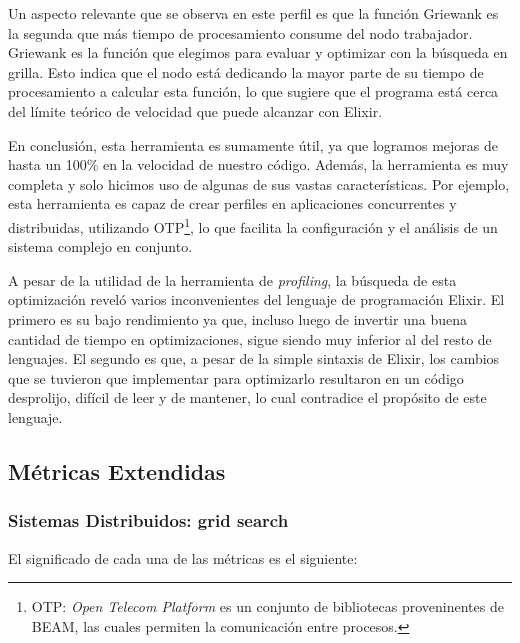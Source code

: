 \documentclass[11pt]{article}
\let\Oldsubsection\subsection
\renewcommand{\subsection}{\FloatBarrier\Oldsubsection}
\let\Oldsubsubsection\subsubsection
\renewcommand{\subsubsection}{\FloatBarrier\Oldsubsubsection}
\newcommand{\english}[1]{\textit{#1}}
\begin{document}
Un aspecto relevante que se observa en este perfil es que la función Griewank es la segunda que más tiempo de procesamiento consume del nodo trabajador. Griewank es la función que elegimos para evaluar y optimizar con la búsqueda en grilla. Esto indica que el nodo está dedicando la mayor parte de su tiempo de procesamiento a calcular esta función, lo que sugiere que el programa está cerca del límite teórico de velocidad que puede alcanzar con Elixir.

En conclusión, esta herramienta es sumamente útil, ya que logramos mejoras de hasta un 100\% en la velocidad de nuestro código. Además, la herramienta es muy completa y solo hicimos uso de algunas de sus vastas características. Por ejemplo, esta herramienta es capaz de crear perfiles en aplicaciones concurrentes y distribuidas, utilizando OTP\footnote{OTP: \english{Open Telecom Platform} es un conjunto de bibliotecas proveninentes de BEAM, las cuales permiten la comunicación entre procesos.}, lo que facilita la configuración y el análisis de un sistema complejo en conjunto.

A pesar de la utilidad de la herramienta de \english{profiling}, la búsqueda de esta optimización reveló varios inconvenientes del lenguaje de programación Elixir. El primero es su bajo rendimiento ya que, incluso luego de invertir una buena cantidad de tiempo en optimizaciones, sigue siendo muy inferior al del resto de lenguajes. El segundo es que, a pesar de la simple sintaxis de Elixir, los cambios que se tuvieron que implementar para optimizarlo resultaron en un código desprolijo, difícil de leer y de mantener, lo cual contradice el propósito de este lenguaje.


\subsection{Métricas Extendidas} \label{sec:anex:metrics} 

\subsubsection{Sistemas Distribuidos: grid search} \label{sec:anex:metrics:gs}

El significado de cada una de las métricas es el siguiente:
\end{document}
